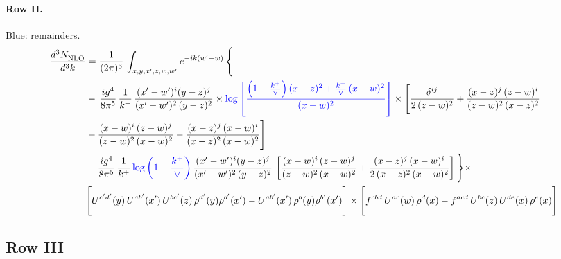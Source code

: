 \documentclass[10pt]{article}
\numberwithin{equation}{section}
\newcommand{\new}[1]{{\color{blue}#1}}
\begin{document}
\paragraph{Row II.}
\new{Blue}: remainders.
\begin{align}
     \frac{d^{3}N_{\rm NLO}^{\rm}}{d^{3}k}  & =   \frac{1}{(2\pi)^{3}}\, \int_{x,y,x',z,w,w^{\prime}} e^{-ik(w^{\prime}-w)}\, \Bigg\{\notag \\
& -\,\frac{ig^{4}}{8\pi^{5}}\,\frac{1}{k^{+}}\,\frac{(x'-w')^{i}(y-z)^{j}}{(x'-w')^{2}\,(y-z)^{2}}\times \new{\log{\left[\frac{\left(1-\frac{k^{+}}{\vee}\right)(x-z)^{2}+\frac{k^{+}}{\vee}\,(x-w)^{2}}{(x-w)^{2}}\right]}}\times \Bigg[\frac{\delta^{ij}}{2\,(z-w)^{2}}+\frac{(x-z)^{j}\,(z-w)^{i}}{(z-w)^{2}\,(x-z)^{2}}\notag \\ & -\frac{(x-w)^{i}\,(z-w)^{j}}{(z-w)^{2}\,(x-w)^{2}}-\frac{(x-z)^{j}\,(x-w)^{i}}{(x-z)^{2}\,(x-w)^{2}}\Bigg] \notag \\
&  -\frac{ig^{4}}{8\pi^{5}}\,\frac{1}{k^{+}}\,\new{\log{\left(1-\frac{k^{+}}{\vee}\right)}}\,\frac{(x'-w')^{i}(y-z)^{j}}{(x'-w')^{2}\,(y-z)^{2}}\,\left[\frac{(x-w)^{i}\,(z-w)^{j}}{(z-w)^{2}\,(x-w)^{2}}+\frac{(x-z)^{j}\,(x-w)^{i}}{2\,(x-z)^{2}\, (x-w)^{2}}\right]\Bigg\}\times \notag \\ & \Bigg[U^{c'd'}(y)\,U^{ab'}(x')\,U^{bc'}(z)\,\rho^{d'}(y)\rho^{b'}(x')-U^{ab'}(x')\,\rho^{b}(y)\rho^{b'}(x')\Bigg]\times\Bigg[f^{cbd}\,U^{ac}(w)\,\rho^{d}(x)-f^{acd}\, U^{bc}(z)\,U^{de}(x)\,\rho^{e}(x)\Bigg] \label{eq:F:G3II}
\end{align}

\subsection{Row III}
\end{document}
